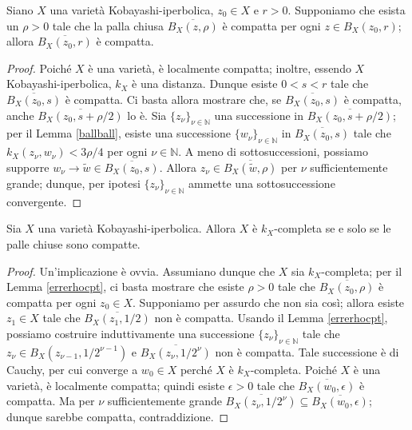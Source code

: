 \begin{lm} \label{errerhocpt}
    Siano $X$ una varietà Kobayashi-iperbolica, $z_0\in X$ e $r>0$. Supponiamo che esista un $\rho>0$ tale che la palla chiusa $\overline{B_X(z,\rho)}$ è compatta per ogni $z\in B_X(z_0,r)$; allora $\overline{B_X(z_0,r)}$ è compatta.
\end{lm}

\begin{proof}
    Poiché $X$ è una varietà, è localmente compatta; inoltre, essendo $X$ Kobayashi-iperbolica, $k_X$ è una distanza. Dunque esiste $0<s<r$ tale che $\overline{B_X(z_0,s)}$ è compatta. Ci basta allora mostrare che, se $\overline{B_X(z_0,s)}$ è compatta, anche $\overline{B_X(z_0,s+\rho/2)}$ lo è. Sia $\{z_\nu\}_{\nu\in\mathbb{N}}$ una successione in $\overline{B_X(z_0,s+\rho/2)}$; per il Lemma \ref{ballball}, esiste una successione $\{w_\nu\}_{\nu\in\mathbb{N}}$ in $\overline{B_X(z_0,s)}$ tale che $k_X(z_\nu,w_\nu)<3\rho/4$ per ogni $\nu\in\mathbb{N}$. A meno di sottosuccessioni, possiamo supporre $w_\nu\longrightarrow \tilde{w}\in\overline{B_X(z_0,s)}$. Allora $z_\nu\in\overline{B_X(\tilde{w},\rho)}$ per $\nu$ sufficientemente grande; dunque, per ipotesi $\{z_\nu\}_{\nu\in\mathbb{N}}$ ammette una sottosuccessione convergente.
\end{proof}

\begin{lm} \label{comp_is_comp}
    Sia $X$ una varietà Kobayashi-iperbolica. Allora $X$ è $k_X$-completa se e solo se le palle chiuse sono compatte.
\end{lm}

\begin{proof}
    Un'implicazione è ovvia. Assumiano dunque che $X$ sia $k_X$-completa; per il Lemma \ref{errerhocpt}, ci basta mostrare che esiste $\rho>0$ tale che $\overline{B_X(z_0,\rho)}$ è compatta per ogni $z_0\in X$. Supponiamo per assurdo che non sia così; allora esiste $z_1\in X$ tale che $\overline{B_X(z_1,1/2)}$ non è compatta. Usando il Lemma \ref{errerhocpt}, possiamo costruire induttivamente una successione $\{z_\nu\}_{\nu\in\mathbb{N}}$ tale che $z_\nu\in B_X(z_{\nu-1},1/2^{\nu-1})$ e $\overline{B_X(z_\nu,1/2^\nu)}$ non è compatta. Tale successione è di Cauchy, per cui converge a $w_0\in X$ perché $X$ è $k_X$-completa. Poiché $X$ è una varietà, è localmente compatta; quindi esiste $\epsilon>0$ tale che $\overline{B_X(w_0,\epsilon)}$ è compatta. Ma per $\nu$ sufficientemente grande $\overline{B_X(z_\nu,1/2^\nu)}\subseteq\overline{B_X(w_0,\epsilon)}$; dunque sarebbe compatta, contraddizione.
\end{proof}

